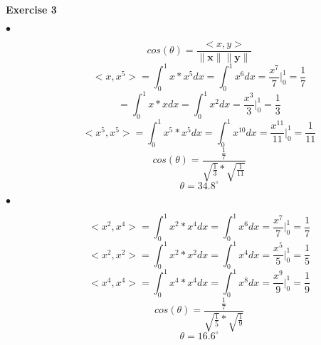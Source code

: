 \documentclass[letterpaper,12pt]{article}
\theoremstyle{definition}
\begin{document}
\vspace{3mm}
\noindent\textbf{Exercise 3}
\begin{description}
  \item[$\bullet$] \[cos(\theta) = \frac{<x,y>}{\lVert\mathbf{x}\rVert \lVert\mathbf{y}\rVert}\]
  \[<x, x^5> = \int_0^1 x * x^5 dx =  \int_0^1 x^6 dx = \frac{x^7}{7}|_0^1 = \frac{1}{7}\]
  \[<x,x> = \int_0^1 x * x dx =  \int_0^1 x^2 dx = \frac{x^3}{3}|_0^1 = \frac{1}{3}\]
  \[<x^5, x^5> = \int_0^1 x^5 * x^5 dx =  \int_0^1 x^{10} dx = \frac{x^{11}}{11}|_0^1 = \frac{1}{11}\]
  \[cos(\theta) = \frac{\frac{1}{7}}{\sqrt{\frac{1}{3}} * \sqrt{\frac{1}{11}}}\]
  \[\theta = 34.8^{\circ}\]
  \item[$\bullet$] \[<x^2, x^4> = \int_0^1 x^2 * x^4 dx =  \int_0^1 x^6 dx = \frac{x^7}{7}|_0^1 = \frac{1}{7}\]
    \[<x^2,x^2> = \int_0^1 x^2 * x^2 dx =  \int_0^1 x^4 dx = \frac{x^5}{5}|_0^1 = \frac{1}{5}\]
  \[<x^4, x^4> = \int_0^1 x^4 * x^4 dx =  \int_0^1 x^8 dx = \frac{x^{9}}{9}|_0^1 = \frac{1}{9}\]
  \[cos(\theta) = \frac{\frac{1}{7}}{\sqrt{\frac{1}{5}} * \sqrt{\frac{1}{9}}}\]
  \[\theta = 16.6^{\circ}\]
\end{description}
\end{document}
